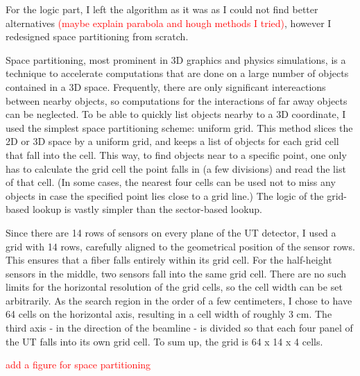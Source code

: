 \documentclass[12pt]{article}
\begin{document}
For the logic part, I left the algorithm as it was as I could not find better alternatives \textcolor{red}{(maybe explain parabola and hough methods I tried)}, however I redesigned space partitioning from scratch.
\vspace{1pc}

Space partitioning, most prominent in 3D graphics and physics simulations, is a technique to accelerate computations that are done on a large number of objects contained in a 3D space. Frequently, there are only significant intereactions between nearby objects, so computations for the interactions of far away objects can be neglected. To be able to quickly list objects nearby to a 3D coordinate, I used the simplest space partitioning scheme: uniform grid. This method slices the 2D or 3D space by a uniform grid, and keeps a list of objects for each grid cell that fall into the cell. This way, to find objects near to a specific point, one only has to calculate the grid cell the point falls in (a few divisions) and read the list of that cell. (In some cases, the nearest four cells can be used not to miss any objects in case the specified point lies close to a grid line.) The logic of the grid-based lookup is vastly simpler than the sector-based lookup.
\vspace{1pc}

Since there are 14  rows of sensors on every plane of the UT detector, I used a grid with 14 rows, carefully aligned to the geometrical position of the sensor rows. This ensures that a fiber falls entirely within its grid cell. For the half-height sensors in the middle, two sensors fall into the same grid cell. There are no such limits for the horizontal resolution of the grid cells, so the cell width can be set arbitrarily. As the search region in the order of a few centimeters, I chose to have 64 cells on the horizontal axis, resulting in a cell width of roughly 3 cm. The third axis - in the direction of the beamline - is divided so that each four panel of the UT falls into its own grid cell. To sum up, the grid is 64 x 14 x 4 cells.
\vspace{1pc}

\textcolor{red}{add a figure for space partitioning}
\end{document}
